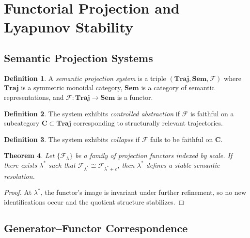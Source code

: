 \documentclass[11pt, twoside]{article}
\theoremstyle{plain}
\newtheorem{theorem}{Theorem}[section]
\theoremstyle{definition}
\newtheorem{definition}[theorem]{Definition}
\theoremstyle{remark}
\begin{document}
\section{Functorial Projection and Lyapunov Stability}
\label{app:functor_lyapunov}

\subsection{Semantic Projection Systems}

\begin{definition}
A \emph{semantic projection system} is a triple $(\mathbf{Traj}, \mathbf{Sem}, \mathcal{F})$ where $\mathbf{Traj}$ is a symmetric monoidal category, $\mathbf{Sem}$ is a category of semantic representations, and $\mathcal{F} : \mathbf{Traj} \to \mathbf{Sem}$ is a functor.
\end{definition}

\begin{definition}
The system exhibits \emph{controlled abstraction} if $\mathcal{F}$ is faithful on a subcategory $\mathbf{C} \subset \mathbf{Traj}$ corresponding to structurally relevant trajectories.
\end{definition}

\begin{definition}
The system exhibits \emph{collapse} if $\mathcal{F}$ fails to be faithful on $\mathbf{C}$.
\end{definition}

\begin{theorem}
Let $\{\mathcal{F}_\lambda\}$ be a family of projection functors indexed by scale. If there exists $\lambda^*$ such that $\mathcal{F}_{\lambda^*} \cong \mathcal{F}_{\lambda^* + \varepsilon}$, then $\lambda^*$ defines a stable semantic resolution.
\end{theorem}

\begin{proof}
At $\lambda^*$, the functor's image is invariant under further refinement, so no new identifications occur and the quotient structure stabilizes.
\end{proof}

\subsection{Generator--Functor Correspondence}
\end{document}
